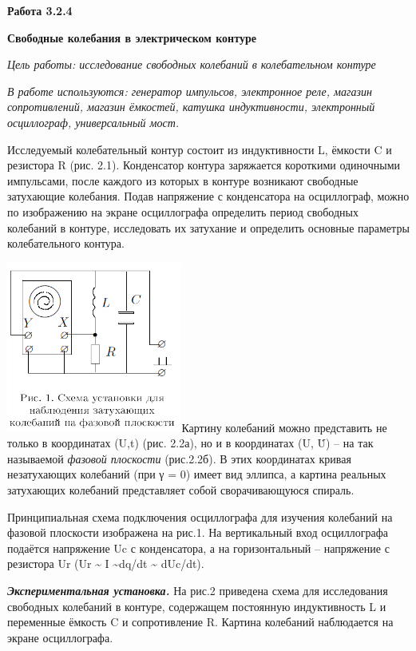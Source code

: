 \textbf{Работа 3.2.4}

\textbf{Свободные колебания в электрическом контуре}

\emph{Цель работы: исследование свободных колебаний в колебательном
контуре}

\emph{В работе используются: генератор импульсов, электронное реле,
магазин сопротивлений, магазин ёмкостей, катушка индуктивности,
электронный осциллограф, универсальный мост.}

Исследуемый колебательный контур состоит из индуктивности L, ёмкости C и
резистора R (рис. 2.1). Конденсатор контура заряжается короткими
одиночными импульсами, после каждого из которых в контуре возникают
свободные затухающие колебания. Подав напряжение с конденсатора на
осциллограф, можно по изображению на экране осциллографа определить
период свободных колебаний в контуре, исследовать их затухание и
определить основные параметры колебательного контура.

\includegraphics[width=2.275in,height=2.20833in]{./media/image1.png}Картину
колебаний можно представить не только в координатах (U,t) (рис. 2.2а),
но и в координатах (U, U̇) -- на так называемой \emph{фазовой плоскости}
(рис.2.2б). В этих координатах кривая незатухающих колебаний (при γ = 0)
имеет вид эллипса, а картина реальных затухающих колебаний представляет
собой сворачивающуюся спираль.

Принципиальная схема подключения осциллографа для изучения колебаний на
фазовой плоскости изображена на рис.1. На вертикальный вход осциллографа
подаётся напряжение Uc с конденсатора, а на горизонтальный -- напряжение
с резистора Ur (Ur \textasciitilde{} I \textasciitilde{}dq/dt
\textasciitilde{} dUc/dt).

\emph{\textbf{Экспериментальная установка.}} На рис.2 приведена схема
для исследования свободных колебаний в контуре, содержащем постоянную
индуктивность L и переменные ёмкость C и сопротивление R. Картина
колебаний наблюдается на экране осциллографа.

